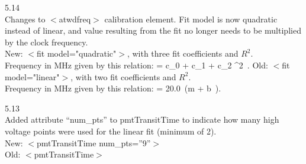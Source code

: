 \documentclass[10pt]{article}
\begin{document}
\item{5.14}\\ 
  Changes to $<$atwdfreq$>$ calibration element.  Fit model is now
  quadratic instead of linear, and value resulting from the fit no longer
  needs to be multiplied by the clock frequency. \\
  New: {$<$fit model="quadratic"$>$}, with three fit coefficients and $R^2$.\\
  Frequency in MHz given by this relation:
  \be
   = c_0 + c_1 \cdot {} + c_2
  \cdot {}^2\ .
  \ee
  Old: {$<$fit model="linear"$>$}, with two fit coefficients and $R^2$.\\
  Frequency in MHz given by this relation:
  \be
   = 20.0\ (m \cdot {} + b\ ).
  \ee

\item{5.13}\\ 
  Added attribute ``num\_pts'' to pmtTransitTime to indicate how
  many high voltage points were used for the linear fit (minimum of 2).\\
  New: $<$pmtTransitTime num\_pts=''9''$>$\\
  Old: $<$pmtTransitTime$>$

\ei
\end{document}
